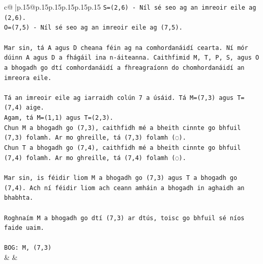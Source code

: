 \documentclass{article}
\begin{document}
{\begin{supertabular}{c@{$\;$}|p{.15\linewidth}@{}p{.15\linewidth}p{.15\linewidth}p{.15\linewidth}p{.15\linewidth}p{.15\linewidth}}
{{{\texttt{S=(2,6) {-} Níl sé seo ag an imreoir eile ag (2,6).} \\
\texttt{O=(7,5) {-} Níl sé seo ag an imreoir eile ag (7,5).} \\
\\ 
\texttt{Mar sin, tá A agus D cheana féin ag na comhordanáidí cearta. Ní mór dúinn A agus D a fhágáil ina n{-}áiteanna. Caithfimid M, T, P, S, agus O a bhogadh go dtí comhordanáidí a fhreagraíonn do chomhordanáidí an imreora eile.} \\
\\ 
\texttt{Tá an imreoir eile ag iarraidh colún 7 a úsáid. Tá M=(7,3) agus T=(7,4) aige.} \\
\texttt{Agam, tá M=(1,1) agus T=(2,3).} \\
\texttt{Chun M a bhogadh go (7,3), caithfidh mé a bheith cinnte go bhfuil (7,3) folamh. Ar mo ghreille, tá (7,3) folamh (◌).} \\
\texttt{Chun T a bhogadh go (7,4), caithfidh mé a bheith cinnte go bhfuil (7,4) folamh. Ar mo ghreille, tá (7,4) folamh (◌).} \\
\\ 
\texttt{Mar sin, is féidir liom M a bhogadh go (7,3) agus T a bhogadh go (7,4). Ach ní féidir liom ach ceann amháin a bhogadh in aghaidh an bhabhta.} \\
\\ 
\texttt{Roghnaím M a bhogadh go dtí (7,3) ar dtús, toisc go bhfuil sé níos faide uaim.} \\
\\ 
\texttt{BOG: M, (7,3)} \\
            }
        }
    }
    & & \\ \\


\end{supertabular}}
\end{document}
